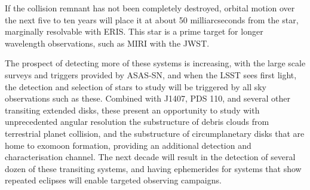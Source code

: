 \documentclass{aa}
\begin{document}
If the collision remnant has not been completely destroyed, orbital motion over the next five to ten years will place it at about 50 milliarcseconds from the star, marginally resolvable with ERIS.
%
This star is a prime target for longer wavelength observations, such as MIRI with the JWST.

The prospect of detecting more of these systems is increasing, with the large scale surveys and triggers provided by ASAS-SN, and when the LSST sees first light, the detection and selection of stars to study will be triggered by all sky observations such as these.
%
Combined with J1407, PDS 110, and several other transiting extended disks, these present an opportunity to study with unprecedented angular resolution the substructure of debris clouds from terrestrial planet collision, and the substructure of circumplanetary disks that are home to exomoon formation, providing an additional detection and characterisation channel.
%
The next decade will result in the detection of several dozen of these transiting systems, and having ephemerides for systems that show repeated eclipses will enable targeted observing campaigns.
\end{document}

